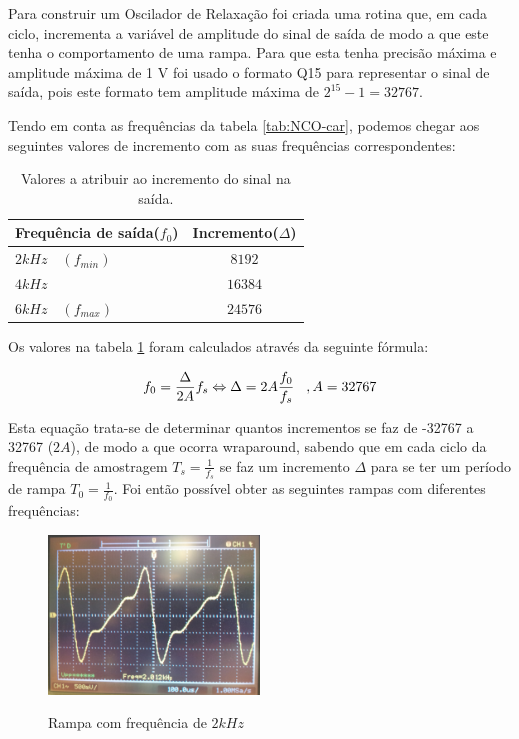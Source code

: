 \documentclass[11pt]{article}
\numberwithin{equation}{section}
\begin{document}
Para construir um Oscilador de Relaxação foi criada uma rotina que, em cada ciclo, incrementa a variável de amplitude do sinal de saída de modo a que este tenha o comportamento de uma rampa. Para que esta tenha precisão máxima e amplitude máxima de 1 V foi usado o formato Q15 para representar o sinal de saída, pois este formato tem amplitude máxima de $2^{15}-1 = 32767 $. 
 
Tendo em conta as frequências da tabela \ref{tab:NCO-car}, podemos chegar aos seguintes valores de incremento com as suas frequências correspondentes:


\begin{table}[H]
	\centering
	\caption{Valores a atribuir ao incremento do sinal na saída.}
	\label{tab:incrementos}
	\begin{tabular}[c]{|l||c|}
		\hline \textbf{Frequência de saída($f_0$)} & \textbf{Incremento($\Delta$)}\\ 
		\hline $ 2 kHz \quad (f_{min}) $ & $ 8192 $\\ 
		\hline $ 4 kHz $ & $ 16384 $  \\ 
		\hline $ 6 kHz \quad (f_{max}) $ & $ 24576 $ \\ 
		\hline
	\end{tabular}
\end{table}

Os valores na tabela \ref{tab:incrementos} foram calculados através da seguinte fórmula:

\begin{equation}
 f_{0}= \frac{\Delta}{2A}f_{s} \Leftrightarrow \Delta= 2A\frac{f_{0}}{f_{s}} \hspace{3 mm}, A=32767
\end{equation}

Esta equação trata-se de determinar quantos incrementos se faz de -32767 a 32767 ($2A$), de modo a que ocorra wraparound, sabendo que em cada ciclo da frequência de amostragem $T_s=\frac{1}{f_s}$ se faz um incremento $\Delta$ para se ter um período de rampa $T_0=\frac{1}{f_0}$.
Foi então possível obter as seguintes rampas com diferentes frequências:


\begin{figure}[H]
	\centering
	\includegraphics[width=0.5\textwidth]{./P1_2kHz}~\\
	\caption{Rampa com frequência de $ 2 kHz $}
\end{figure}
\end{document}
